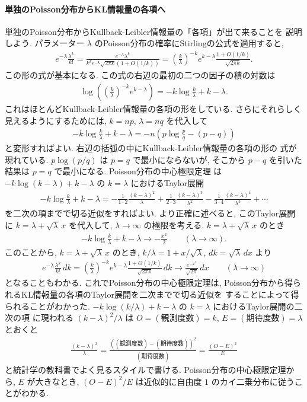 \documentclass[12pt,twoside]{jarticle}
\theoremstyle{jplain}
\theoremstyle{jplain}
\theoremstyle{jplain}
\numberwithin{theorem}{section}
\numberwithin{equation}{section}
\numberwithin{figure}{section}
\numberwithin{table}{section}
\begin{document}
\paragraph{単独のPoisson分布からKL情報量の各項へ}
単独のPoisson分布からKullback-Leibler情報量の「各項」が出て来ることを
説明しよう. パラメーター $\lambda$ のPoisson分布の確率にStirlingの公式を適用すると,
\begin{align*}
e^{-\lambda}\frac{\lambda^k}{k!}
=\frac{e^{-\lambda}\lambda^k}{k^k e^{-k}\sqrt{2\pi k}(1+O(1/k))}
=\left(\frac{k}{\lambda}\right)^{-k}e^{k-\lambda}\frac{1+O(1/k)}{\sqrt{2\pi k}}.
\end{align*} 
この形の式が基本になる. この式の右辺の最初の二つの因子の積の対数は 
\begin{align*}
\log\left(\left(\frac{k}{\lambda}\right)^{-k}e^{k-\lambda}\right)
=-k\log\frac{k}{\lambda}+k-\lambda.
\end{align*}
これはほとんどKullback-Leibler情報量の各項の形をしている.
さらにそれらしく見えるようにするためには, $k=np$, $\lambda=nq$ を代入して
\begin{align*}
-k\log\frac{k}{\lambda}+k-\lambda
=-n\left(p\log\frac{p}{q}-(p-q)\right)
\end{align*}
と変形すればよい. 右辺の括弧の中にKullback-Leibler情報量の各項の形の
式が現れている.
$p\log(p/q)$ は $p=q$ で最小にならないが, 
そこから $p-q$ を引いた結果は $p=q$ で最小になる.
Poisson分布の中心極限定理
は $-k\log(k-\lambda)+k-\lambda$ の $k=\lambda$ におけるTaylor展開
\begin{align*}
-k\log\frac{k}{\lambda}+k-\lambda
=-\frac{1}{1\cdot2}\frac{(k-\lambda)^2}{\lambda}
+\frac{1}{2\cdot3}\frac{(k-\lambda)^3}{\lambda^2}
-\frac{1}{3\cdot4}\frac{(k-\lambda)^4}{\lambda^3}
+\cdots
\end{align*}
を二次の項までで切る近似をすればよい. 
より正確に述べると, 
このTaylor展開に $k=\lambda+\sqrt\lambda\,x$ を代入して, 
$\lambda\to\infty$ の極限を考える. $k=\lambda+\sqrt\lambda\,x$ のとき
\begin{align*}
-k\log\frac{k}{\lambda}+k-\lambda \longrightarrow -\frac{x^2}{2}
\qquad (\lambda\to\infty).
\end{align*}
このことから, $k=\lambda+\sqrt\lambda\,x$ のとき, 
$k/\lambda=1+x/\sqrt{\lambda}$, $dk=\sqrt{\lambda}\,dx$ より
\begin{align*}
e^{-\lambda}\frac{\lambda^k}{k!}\,dk
=\left(\frac{k}{\lambda}\right)^{-k}e^{k-\lambda}\frac{1+O(1/k)}{\sqrt{2\pi k}}\,dk
\longrightarrow
\frac{e^{-x^2}}{\sqrt{2\pi}}\,dx
\qquad (\lambda\to\infty)
\end{align*}
となることもわかる. これでPoisson分布の中心極限定理は, 
Poisson分布から得られるKL情報量の各項のTaylor展開を二次までで切る近似を
することによって得られることがわかった.
$-k\log(k/\lambda)+k-\lambda$ の $k=\lambda$ におけるTaylor展開の二次の項
に現われる $(k-\lambda)^2/\lambda$ は $O=(\text{観測度数})=k$, 
$E=(\text{期待度数})=\lambda$ とおくと
\begin{align*}
\frac{(k-\lambda)^2}{\lambda}
=\frac{((\text{観測度数})-(\text{期待度数}))^2}{(\text{期待度数})}
=\frac{(O-E)^2}{E}
\end{align*}
と統計学の教科書でよく見るスタイルで書ける.
Poisson分布の中心極限定理から, $E$ が大きなとき, 
$(O-E)^2/E$ は近似的に自由度 $1$ のカイ二乗分布に従うことがわかる.
\end{document}
